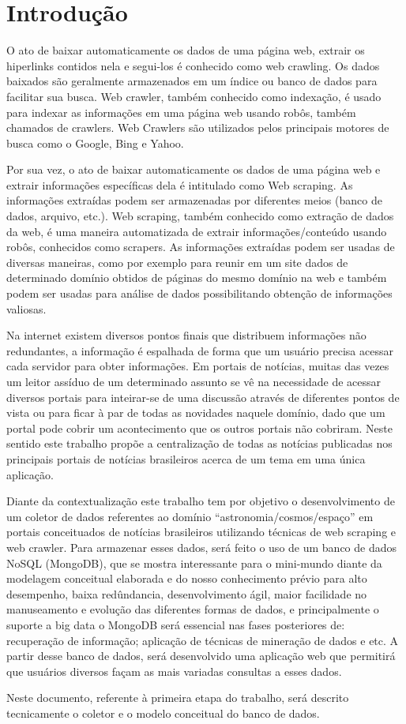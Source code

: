 \section{Introdução}
O ato de baixar automaticamente os dados de uma página web, extrair os hiperlinks contidos nela e segui-los é conhecido como web crawling. Os dados baixados são geralmente armazenados em um índice ou banco de dados para facilitar sua busca. Web crawler, também conhecido como indexação, é usado para indexar as informações em uma página web usando robôs, também chamados de crawlers. Web Crawlers são utilizados pelos principais motores de busca como o Google, Bing e Yahoo.

Por sua vez, o ato de baixar automaticamente os dados de uma página web e extrair informações específicas dela é intitulado como Web scraping. As informações extraídas podem ser armazenadas por diferentes meios (banco de dados, arquivo, etc.). Web scraping, também conhecido como extração de dados da web, é uma maneira automatizada de extrair informações/conteúdo usando robôs, conhecidos como scrapers. As informações extraídas podem ser usadas de diversas maneiras, como por exemplo para reunir em um site dados de determinado domínio obtidos de páginas do mesmo domínio na web e também podem ser usadas para análise de dados possibilitando obtenção de informações valiosas.

Na internet existem diversos pontos finais que distribuem informações não redundantes, a informação é espalhada de forma que um usuário precisa acessar cada servidor para obter informações. Em portais de notícias, muitas das vezes um leitor assíduo de um determinado assunto se vê na necessidade de acessar diversos portais para inteirar-se de uma discussão através de diferentes pontos de vista ou para ficar à par de todas as novidades naquele domínio, dado que um portal pode cobrir um acontecimento que os outros portais não cobriram. Neste sentido este trabalho propõe a centralização de todas as notícias publicadas nos principais portais de notícias brasileiros acerca de um tema em uma única aplicação.

Diante da contextualização este trabalho tem por objetivo o desenvolvimento de um coletor de dados referentes ao domínio “astronomia/cosmos/espaço” em portais conceituados de notícias brasileiros utilizando técnicas de web scraping e web crawler. Para armazenar esses dados, será feito o uso de um banco de dados NoSQL (MongoDB), que se mostra interessante para o mini-mundo diante da modelagem conceitual elaborada e do nosso conhecimento prévio para alto desempenho, baixa redûndancia, desenvolvimento ágil, maior facilidade no manuseamento e evolução das diferentes formas de dados, e principalmente o suporte a big data o MongoDB será essencial nas fases posteriores de: recuperação de informação; aplicação de técnicas de mineração de dados e etc. A partir desse banco de dados, será desenvolvido uma aplicação web que permitirá que usuários diversos façam as mais variadas consultas a esses dados.

Neste documento, referente à primeira etapa do trabalho, será descrito tecnicamente o coletor e o modelo conceitual do banco de dados.
